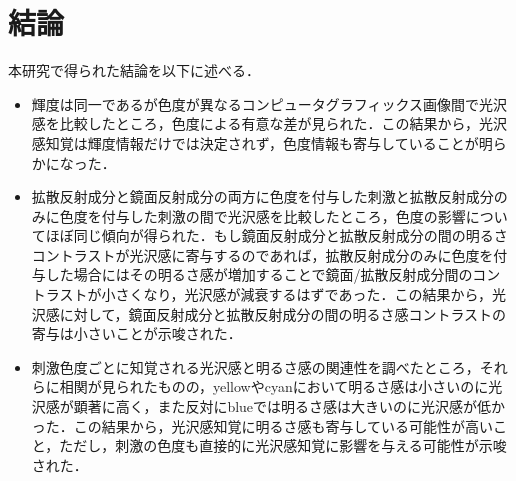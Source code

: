 \chapter{結論}

    本研究で得られた結論を以下に述べる．
    \begin{itemize}
        \item 輝度は同一であるが色度が異なるコンピュータグラフィックス画像間で光沢感を比較したところ，色度による有意な差が見られた．この結果から，光沢感知覚は輝度情報だけでは決定されず，色度情報も寄与していることが明らかになった．
        \item 拡散反射成分と鏡面反射成分の両方に色度を付与した刺激と拡散反射成分のみに色度を付与した刺激の間で光沢感を比較したところ，色度の影響についてほぼ同じ傾向が得られた．もし鏡面反射成分と拡散反射成分の間の明るさコントラストが光沢感に寄与するのであれば，拡散反射成分のみに色度を付与した場合にはその明るさ感が増加することで鏡面/拡散反射成分間のコントラストが小さくなり，光沢感が減衰するはずであった．この結果から，光沢感に対して，鏡面反射成分と拡散反射成分の間の明るさ感コントラストの寄与は小さいことが示唆された．
        \item 刺激色度ごとに知覚される光沢感と明るさ感の関連性を調べたところ，それらに相関が見られたものの，yellowやcyanにおいて明るさ感は小さいのに光沢感が顕著に高く，また反対にblueでは明るさ感は大きいのに光沢感が低かった．この結果から，光沢感知覚に明るさ感も寄与している可能性が高いこと，ただし，刺激の色度も直接的に光沢感知覚に影響を与える可能性が示唆された．
    \end{itemize}
    \newpage